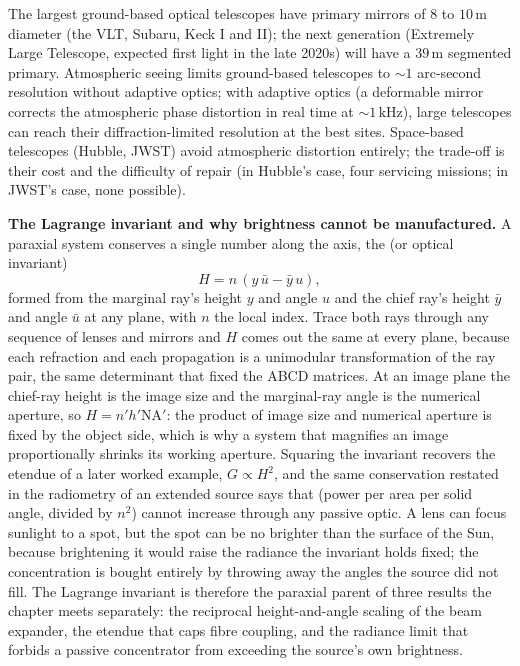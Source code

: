 The largest ground-based optical telescopes have primary mirrors of
$8$ to $10\,\si{\meter}$ diameter (the VLT, Subaru, Keck I and II);
the next generation (Extremely Large Telescope, expected first light
in the late 2020s) will have a $39\,\si{\meter}$ segmented primary.
Atmospheric seeing limits ground-based telescopes to $\sim 1$
arc-second resolution without adaptive optics; with adaptive optics
(a deformable mirror corrects the atmospheric phase distortion in
real time at $\sim 1\,\si{\kilo\hertz}$), large telescopes can reach
their diffraction-limited resolution at the best sites. Space-based
telescopes (Hubble, JWST) avoid atmospheric distortion entirely; the
trade-off is their cost and the difficulty of repair (in Hubble's
case, four servicing missions; in JWST's case, none possible).

\begin{mastery}
\textbf{The Lagrange invariant and why brightness cannot be manufactured.} A
paraxial system conserves a single number along the axis, the  (or optical invariant)
\[
H = n\,(y\,\bar{u} - \bar{y}\,u),
\]
formed from the marginal ray's height $y$ and angle $u$ and the chief ray's height
$\bar{y}$ and angle $\bar{u}$ at any plane, with $n$ the local index. Trace both
rays through any sequence of lenses and mirrors and $H$ comes out the same at every
plane, because each refraction and each propagation is a unimodular transformation
of the ray pair, the same determinant that fixed the ABCD matrices. At an image
plane the chief-ray height is the image size and the marginal-ray angle is the
numerical aperture, so $H = n' h' \mathrm{NA}'$: the product of image size and
numerical aperture is fixed by the object side, which is why a system that
magnifies an image proportionally shrinks its working aperture. Squaring the
invariant recovers the etendue of a later worked example, $G \propto H^2$, and the
same conservation restated in the radiometry of an extended source says that
 (power per area per solid angle, divided by $n^2$) cannot
increase through any passive optic. A lens can focus sunlight to a spot, but the
spot can be no brighter than the surface of the Sun, because brightening it would
raise the radiance the invariant holds fixed; the concentration is bought entirely
by throwing away the angles the source did not fill. The Lagrange invariant is
therefore the paraxial parent of three results the chapter meets separately: the
reciprocal height-and-angle scaling of the beam expander, the etendue that caps
fibre coupling, and the radiance limit that forbids a passive concentrator from
exceeding the source's own brightness.
\end{mastery}

